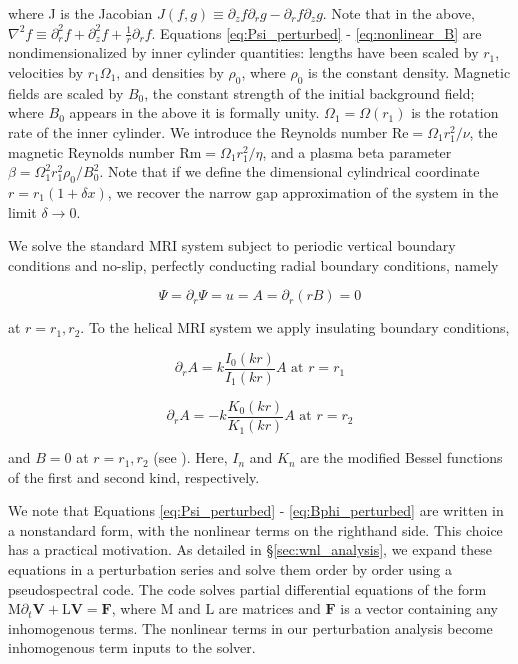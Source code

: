 \documentclass{emulateapj}
\newcommand{\beq}{\begin{equation}}
\newcommand{\eeq}{\end{equation}}
\newcommand{\citei}[1]{\citeauthor{#1} \citeyear{#1}}
\newcommand\reye{\mathrm{Re}}
\newcommand\reym{\mathrm{Rm}}
\begin{document}
where J is the Jacobian $J(f, g) \equiv \partial_z f \partial_r g - \partial_r f \partial_z g$. Note that in the above, $\nabla^2 f \equiv \partial_r^2 f + \partial_z^2 f + \frac{1}{r} \partial_r f$. Equations \ref{eq:Psi_perturbed} - \ref{eq:nonlinear_B} are nondimensionalized by inner cylinder quantities: lengths have been scaled by $r_1$, velocities by $r_1 \Omega_1$, and densities by $\rho_0$, where $\rho_0$ is the constant density. Magnetic fields are scaled by $B_0$, the constant strength of the initial background field; where $B_0$ appears in the above it is formally unity. $\Omega_1 = \Omega(r_1)$ is the rotation rate of the inner cylinder. We introduce the Reynolds number $\reye = \Omega_1 r_1^2/\nu$, the magnetic Reynolds number $\reym = \Omega_1 r_1^2 / \eta$, and a plasma beta parameter $\beta = \Omega_1^2 r_1^2 \rho_0/B_0^2$. Note that if we define the dimensional cylindrical coordinate $r = r_1(1 + \delta x)$, we recover the narrow gap approximation of the system in the limit $\delta \rightarrow 0$.

We solve the standard MRI system subject to periodic vertical boundary conditions and no-slip, perfectly conducting radial boundary conditions, namely

\beq
\Psi = \partial_r \Psi = u = A = \partial_r (r B) = 0
\eeq

at $r = r_1, r_2$. To the helical MRI system we apply insulating boundary conditions,

\beq
\partial_r A = k \frac{I_0 (k r)}{I_1 (k r)} A \, \, \mathrm{at} \, \, r = r_1
\eeq

\beq
\partial_r A = - k \frac{K_0 (k r)}{K_1 (k r)} A \, \, \mathrm{at} \, \, r = r_2
\eeq

and $B = 0$ at $r = r_1, r_2$ (see \citei{Willis:2002bh}). Here, $I_n$ and $K_n$ are the modified Bessel functions of the first and second kind, respectively.

We note that Equations \ref{eq:Psi_perturbed} - \ref{eq:Bphi_perturbed} are written in a nonstandard form, with the nonlinear terms on the righthand side. This choice has a practical motivation. As detailed in \S\ref{sec:wnl_analysis}, we expand these equations in a perturbation series and solve them order by order using a pseudospectral code. The code solves partial differential equations of the form $\mathrm{M} \partial_t \mathbf{V} + \mathrm{L} \mathbf{V} = \mathbf{F}$, where $\mathrm{M}$ and $\mathrm{L}$ are matrices and $\mathbf{F}$ is a vector containing any inhomogenous terms. The nonlinear terms in our perturbation analysis become inhomogenous term inputs to the solver.
\end{document}
